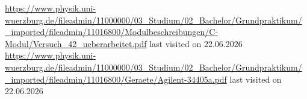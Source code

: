 \documentclass[a4paper,10pt,twocolumn]{scrartcl} %
\begin{document}




















\begin{thebibliography}{}    %
	\url{https://www.physik.uni-wuerzburg.de/fileadmin/11000000/03_Studium/02_Bachelor/Grundpraktikum/_imported/fileadmin/11016800/Modulbeschreibungen/C-Modul/Versuch_42_ueberarbeitet.pdf} last visited on 22.06.2026
	\url{https://www.physik.uni-wuerzburg.de/fileadmin/11000000/03_Studium/02_Bachelor/Grundpraktikum/_imported/fileadmin/11016800/Geraete/Agilent-34405a.pdf} last visited on 22.06.2026
\end{thebibliography}
\end{document}
